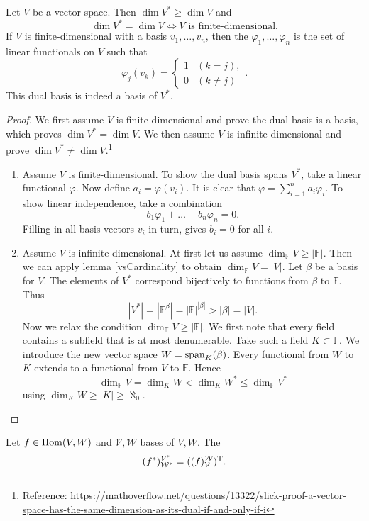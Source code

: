 \begin{proposition} \label{dualBasisDimension}
Let $V$ be a vector space. Then $\dim V^* \geq \dim V$ and
\[ \dim V^* = \dim V \iff \text{$V$ is finite-dimensional}. \]
If $V$ is finite-dimensional with a basis $v_1, \ldots, v_n$, then the  $\varphi_1, \ldots, \varphi_n$ is the set of linear functionals on $V$ such that
\[ \varphi_j(v_k) = \begin{cases}
1 & (k=j), \\ 0 & (k\neq j)
\end{cases}. \]
This dual basis is indeed a basis of $V^*$.
\end{proposition}
\begin{proof}
We first assume $V$ is finite-dimensional and prove the dual basis is a basis, which proves $\dim V^* = \dim V$. We then assume $V$ is infinite-dimensional and prove $\dim V^* \neq \dim V$.\footnote{Reference: \url{https://mathoverflow.net/questions/13322/slick-proof-a-vector-space-has-the-same-dimension-as-its-dual-if-and-only-if-i}}
\begin{enumerate}
\item Assume $V$ is finite-dimensional. To show the dual basis spans $V^*$, take a linear functional $\varphi$. Now define $a_i = \varphi(v_i)$. It is clear that $\varphi = \sum_{i=1}^n a_i\varphi_i$. To show linear independence, take a combination
\[ b_1\varphi_1 + \ldots +b_n\varphi_n =0. \]
Filling in all basis vectors $v_i$ in turn, gives $b_i=0$ for all $i$.
\item Assume $V$ is infinite-dimensional. At first let us assume $\dim_{\mathbb{F}}V \geq |\mathbb{F}|$. Then we can apply lemma \ref{vsCardinality} to obtain $\dim_{\mathbb{F}}V = |V|$. Let $\beta$ be a basis for $V$. The elements of $V^*$ correspond bijectively to functions from $\beta$ to $\mathbb{F}$. Thus
\[ |V^*| = |\mathbb{F}^\beta| = |\mathbb{F}|^{|\beta|} > |\beta| = |V|. \]
Now we relax the condition $\dim_{\mathbb{F}}V \geq |\mathbb{F}|$. We first note that every field contains a subfield that is at most denumerable. Take such a field $K\subset \mathbb{F}$. We introduce the new vector space $W = \operatorname{span}_K(\beta)$. Every functional from $W$ to $K$ extends to a functional from $V$ to $\mathbb{F}$. Hence
\[ \dim_\mathbb{F} V = \dim_K W < \dim_K W^* \leq \dim_{\mathbb{F}} V^* \]
using $\dim_{K}W \geq |K| \geq \aleph_0$.
\end{enumerate}
\end{proof}


\begin{proposition}
Let $f\in\operatorname{Hom}(V,W)$ and $\mathcal{V}, \mathcal{W}$ bases of $V,W$. The
\[ (f^*)^{\mathcal{V}^*}_{\mathcal{W}^*} = ((f)^{\mathcal{W}}_{\mathcal{V}})^{\mathrm{T}}. \] \label{transpDual}
\end{proposition}

